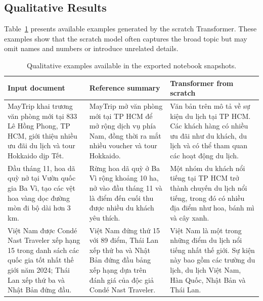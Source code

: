 \documentclass[conference]{IEEEtran}
\begin{document}
\subsection{Qualitative Results}
Table~\ref{tab:qualitative} presents available examples generated by the scratch Transformer. These examples show that the scratch model often captures the broad topic but may omit names and numbers or introduce unrelated details.

\begin{table}[htbp]
\centering
\caption{Qualitative examples available in the exported notebook snapshots.}
\label{tab:qualitative}
\begin{tabular}{p{}p{}p{}}
\toprule
Input document & Reference summary & Transformer from scratch \\
\midrule
MayTrip khai trương văn phòng mới tại 833 Lê Hồng Phong, TP HCM, giới thiệu nhiều ưu đãi du lịch và tour Hokkaido dịp Tết. & MayTrip mở văn phòng mới tại TP HCM để mở rộng dịch vụ phía Nam, đồng thời ra mắt nhiều voucher và tour Hokkaido. & Văn bản trên mô tả về sự kiện du lịch tại TP HCM. Các khách hàng có nhiều ưu đãi như du khách, du lịch và có thể tham quan các hoạt động du lịch. \\
\midrule
Đầu tháng 11, hoa dã quỳ nở tại Vườn quốc gia Ba Vì, tạo các vệt hoa vàng dọc đường mòn đi bộ dài hơn 3 km. & Rừng hoa dã quỳ ở Ba Vì rộng khoảng 10 ha, nở vào đầu tháng 11 và là điểm đến cuối thu được nhiều du khách yêu thích. & Một nhóm du khách nổi tiếng tại TP HCM trở thành chuyến du lịch nổi tiếng, trong đó có nhiều địa điểm như hoa, bánh mì và cây xanh. \\
\midrule
Việt Nam được Condé Nast Traveler xếp hạng 15 trong danh sách các quốc gia tốt nhất thế giới năm 2024; Thái Lan xếp thứ ba và Nhật Bản đứng đầu. & Việt Nam đứng thứ 15 với 89 điểm, Thái Lan xếp thứ ba và Nhật Bản đứng đầu bảng xếp hạng dựa trên đánh giá của độc giả Condé Nast Traveler. & Việt Nam là một trong những điểm du lịch nổi tiếng nhất thế giới. Sự kiện này bao gồm các trường du lịch, du lịch Việt Nam, Hàn Quốc, Nhật Bản và Thái Lan. \\
\bottomrule
\end{tabular}
\end{table}
\end{document}
